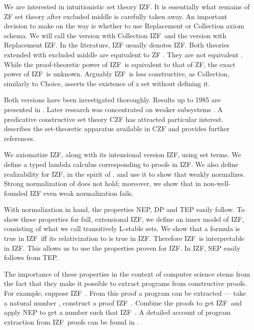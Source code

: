 \documentclass{LMCS}
\newcommand{\izfc}{IZF}
\newcommand{\izfr}{IZF}
\newcommand{\iizfr}{IZF}
\begin{document}
We are interested in intuitionistic set theory IZF. It is essentially what 
remains of ZF set theory after excluded middle is carefully taken away. An important 
decision to make on the way is whether to use Replacement or Collection axiom schema. 
We will call the version with Collection \izfc\  and the version with Replacement \izfr. In the literature,
IZF usually denotes \izfc. Both theories extended with excluded middle are
equivalent to ZF \cite{friedmancons}. They are not equivalent \cite{frsce3}.
While the proof-theoretic power of \izfc\ is equivalent to that of ZF, the exact
power of \izfr\ is unknown. Arguably \izfc\ is less constructive, as
Collection, similarly to Choice, asserts the existence of a set without
defining it. 

Both versions have been investigated thoroughly. Results up to 1985 are
presented in \cite{beesonbook,scedrov85}. Later research was concentrated on
weaker subsystems \cite{ar,ikp}. A predicative constructive set theory CZF has attracted
particular interest. \cite{ar} describes the set-theoretic apparatus
available in CZF and provides further references.

We axiomatize \izfr, along with its intensional version \iizfr, using set
terms. We define a typed lambda calculus  corresponding to proofs in
\iizfr. We also define realizability for \iizfr, in the spirit of
\cite{mccarty}, and use it to show that  weakly normalizes. Strong normalization of  does not hold; moreover, we show
that in non-well-founded IZF even weak normalization fails.

With normalization in hand, the properties NEP, DP and TEP
easily follow. To show these properties for full, extensional \izfr, we define an inner
model  of \izfr, consisting of what we call transitively L-stable sets.
We show that a formula is true in \izfr\ iff its relativization to  is true
in \iizfr. Therefore \izfr\ is interpretable in \iizfr. This allows us to use 
the properties proven for \iizfr. In \izfr, SEP easily follows from TEP. 

The importance of these properties in the context of computer science stems
from the fact that they make it possible to extract programs from
constructive proofs. For example, suppose \izfr\ . From this proof a program can be extracted --- 
take a natural number , construct a proof \izfr\ . Combine the proofs to get \izfr\  and apply 
NEP to get a number  such that \izfr\ . A
detailed account of program extraction from \izfr\ proofs can be found in \cite{chol}.
\end{document}
